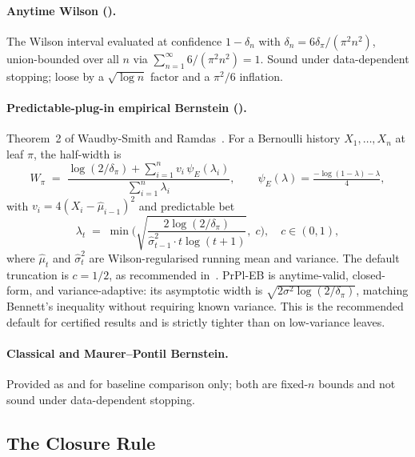 \paragraph{Anytime Wilson ().}
The Wilson interval evaluated at confidence $1 - \delta_n$ with
$\delta_n = 6\delta_\pi/(\pi^2 n^2)$, union-bounded over all $n$ via
$\sum_{n=1}^\infty 6/(\pi^2 n^2) = 1$.  Sound under data-dependent
stopping; loose by a $\sqrt{\log n}$ factor and a $\pi^2/6$
inflation.

\paragraph{Predictable-plug-in empirical Bernstein ().}
Theorem~2 of Waudby-Smith and Ramdas~\cite{waudbysmith2024betting}.
For a Bernoulli history $X_1,\ldots,X_n$ at leaf $\pi$, the half-width
is
\begin{equation}\label{eq:prpl-eb}
  W_\pi \;=\;
    \frac{\log(2/\delta_\pi) + \sum_{i=1}^n v_i\,\psi_E(\lambda_i)}
         {\sum_{i=1}^n \lambda_i},
  \qquad
  \psi_E(\lambda) = \tfrac{-\log(1-\lambda) - \lambda}{4},
\end{equation}
with $v_i = 4(X_i - \hat\mu_{i-1})^2$ and predictable bet
\begin{equation}
  \lambda_t \;=\; \min\!\Bigg(
    \sqrt{\frac{2\log(2/\delta_\pi)}
              {\hat\sigma_{t-1}^2 \cdot t\log(t+1)}},\;c\Bigg),
  \quad c \in (0,1),
\end{equation}
where $\hat\mu_t$ and $\hat\sigma_t^2$ are Wilson-regularised running
mean and variance.  The default truncation is $c = 1/2$, as
recommended in~\cite[\S3.2]{waudbysmith2024betting}.  PrPl-EB is
anytime-valid, closed-form, and variance-adaptive: its asymptotic
width is $\sqrt{2\sigma^2\log(2/\delta_\pi)}$, matching Bennett's
inequality without requiring known variance.  This is the recommended
default for certified results and is strictly tighter than
 on low-variance leaves.

\paragraph{Classical and Maurer--Pontil Bernstein.}
Provided as  and  for
baseline comparison only; both are fixed-$n$ bounds and not sound
under data-dependent stopping.

\subsection{The Closure Rule}\label{sec:closure}

